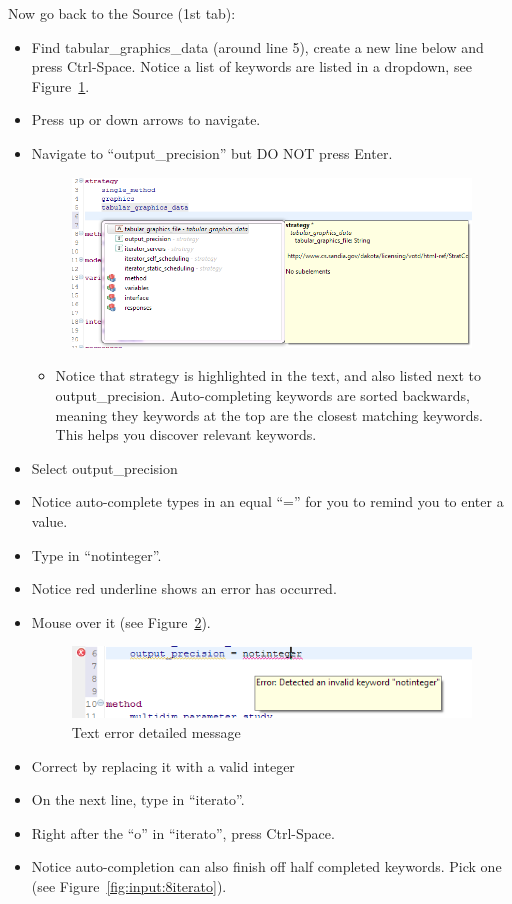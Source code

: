 Now go back to the Source (1st tab):
\begin{itemize}
\item Find tabular\_graphics\_data (around line 5), create a new line below and press Ctrl-Space. Notice a list of keywords are listed in a dropdown, see Figure~\ref{fig:input:6Autocomplete}.
\item Press up or down arrows to navigate.
\item Navigate to ``output\_precision'' but DO NOT press Enter.
\begin{figure}[htbp]
  \centering
  \includegraphics[scale=0.6]{images/6Autocomplete}
  \caption{}
  \label{fig:input:6Autocomplete}
\end{figure}
\begin{itemize}
\item Notice that strategy is highlighted in the text, and also listed next to output\_precision. Auto-completing keywords are sorted backwards, meaning they keywords at the top are the closest matching keywords. This helps you discover relevant keywords.
\end{itemize}
\item Select output\_precision
\item Notice auto-complete types in an equal ``='' for you to remind you to enter a value.
\item Type in ``notinteger''.
\item Notice red underline shows an error has occurred.
\item Mouse over it (see Figure~\ref{fig:input:7texterror}).
\begin{figure}[htbp]
  \centering
  \includegraphics[scale=0.6]{images/7texterror}
  \caption{Text error detailed message}
  \label{fig:input:7texterror}
\end{figure}
\item Correct by replacing it with a valid integer
\item On the next line, type in ``iterato''.
\item Right after the ``o'' in ``iterato'', press Ctrl-Space.
\item Notice auto-completion can also finish off half completed keywords. Pick one (see Figure~\ref{fig:input:8iterato}).
\end{itemize}
